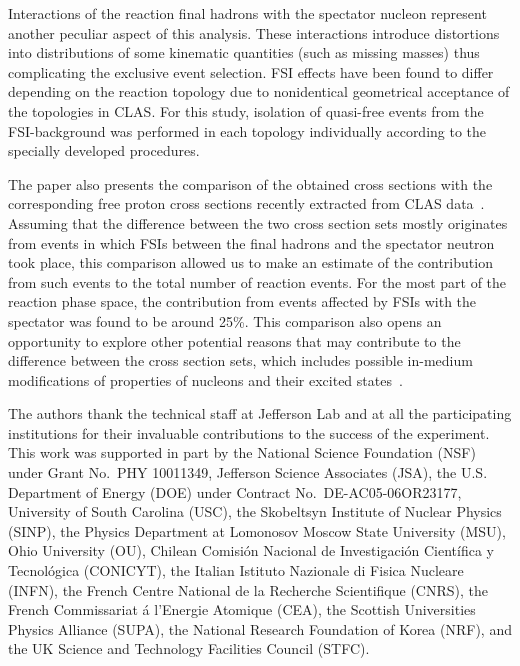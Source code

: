 \documentclass[prc,twocolumn,superscriptaddress,showpacs,amssymb,amsmath,amsfonts,aps,nofootinbib]{revtex4-1}
\begin{document}
Interactions of the reaction final hadrons with the spectator nucleon represent another peculiar aspect of this analysis. These interactions introduce distortions into distributions of some kinematic quantities (such as missing masses) thus complicating the exclusive event selection. FSI effects have been found to differ depending on the reaction topology due to nonidentical geometrical acceptance of the topologies in CLAS. For this study, isolation of quasi-free events from the FSI-background was performed in each topology individually according to the specially developed procedures.



The paper also presents the comparison of the obtained cross sections with the corresponding free proton cross sections recently extracted from CLAS data~\cite{Fed_an_note:2017,Fed_paper_2018}. Assuming that the difference between the two cross section sets mostly originates from events in which FSIs between the final hadrons and the spectator neutron took place, this comparison allowed us to make an estimate of the contribution from such events to the total number of reaction events. For the most part of the reaction phase space, the contribution from events affected by FSIs with the spectator was found to be around 25\%. This comparison also opens an opportunity to explore other potential reasons that may contribute to the difference between the cross section sets, which includes possible in-medium modifications of properties of nucleons and their excited states~\cite{Mokeev:1995fy,Bianchi:1994ax,Ahrens:1986hn,Krusche:2004xz,Noble:1980my}.


\vspace{2em}

\begin{acknowledgments}
The authors thank the technical staff at Jefferson Lab and at all the participating institutions for their invaluable contributions to the success of the experiment.
This work was supported in part by the National Science Foundation (NSF) under Grant No.~PHY 10011349, Jefferson Science Associates (JSA), the U.S. Department of Energy (DOE) under Contract No.~DE-AC05-06OR23177, University of South Carolina (USC), the Skobeltsyn Institute of Nuclear Physics (SINP), the Physics Department at Lomonosov Moscow State University (MSU), Ohio University (OU), Chilean Comisi\'on Nacional de Investigaci\'on Cient\'ifica y Tecnol\'ogica (CONICYT), the Italian Istituto Nazionale di Fisica Nucleare (INFN), the French Centre National de la Recherche Scientifique (CNRS), the French Commissariat \'a l'Energie Atomique (CEA), the Scottish Universities Physics Alliance (SUPA), the National Research Foundation of Korea (NRF), and the UK Science and Technology Facilities Council (STFC). 


\end{acknowledgments}


{}

\end{document}
